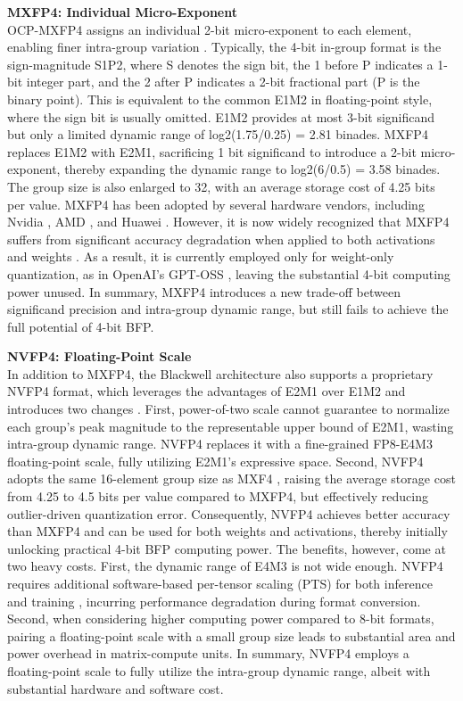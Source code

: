 \noindent\textbf{MXFP4: Individual Micro-Exponent} \\ 
OCP-MXFP4 assigns an individual 2-bit micro-exponent to each 
element, enabling finer intra-group variation \cite{Rouhani2023a}. 
Typically, the 4-bit in-group format is the sign-magnitude S1P2, 
where S denotes the sign bit, the 1 before P indicates a 1-bit integer part, 
and the 2 after P indicates a 2-bit fractional part (P is the binary point).
This is equivalent to the common E1M2 in floating-point style, where the 
sign bit is usually omitted. 
E1M2 provides at most 3-bit significand but only a limited dynamic range of 
log2(1.75/0.25) = 2.81 binades.  
MXFP4 replaces E1M2 with E2M1, sacrificing 1 bit significand to introduce 
a 2-bit micro-exponent, thereby expanding the dynamic range to 
log2(6/0.5) = 3.58 binades. 
The group size is also enlarged to 32, with an average storage cost of 4.25 
bits per value. 
MXFP4 has been adopted by several hardware vendors, including 
Nvidia \cite{Micikevicius2025}, AMD \cite{AMD2025}, and Huawei \cite{Eric2025}. 
However, it is now widely recognized that MXFP4 suffers from significant 
accuracy degradation when applied to both activations and weights 
\cite{Rouhani2023}. 
As a result, it is currently employed only for weight-only quantization, 
as in OpenAI's GPT-OSS \cite{Agarwal2025}, leaving the substantial 4-bit 
computing power unused. 
In summary, MXFP4 introduces a new trade-off between significand precision 
and intra-group dynamic range, 
but still fails to achieve the full potential of 4-bit BFP. 

\noindent\textbf{NVFP4: Floating-Point Scale} \\
In addition to MXFP4, the Blackwell architecture also supports a proprietary 
NVFP4 format, 
which leverages the advantages of E2M1 over E1M2 and introduces two changes 
\cite{Micikevicius2025}. 
First, power-of-two scale cannot guarantee to normalize each group's peak 
magnitude to the representable upper bound of E2M1, 
wasting intra-group dynamic range. 
NVFP4 replaces it with a fine-grained FP8-E4M3 floating-point scale, 
fully utilizing E2M1's expressive space. 
Second, NVFP4 adopts the same 16-element group size 
as MXF4 \cite{DarvishRouhani2023}, 
raising the average storage cost from 4.25 to 4.5 bits per value compared to 
MXFP4, but effectively reducing outlier-driven quantization error. 
Consequently, NVFP4 achieves better accuracy than MXFP4 and can be used for 
both weights and activations, 
thereby initially unlocking practical 4-bit BFP computing power. 
The benefits, however, come at two heavy costs. 
First, the dynamic range of E4M3 is not wide enough. 
NVFP4 requires additional software-based per-tensor scaling (PTS) for both 
inference \cite{Alvarez2025} and training \cite{Abecassis2025}, 
incurring performance degradation during format conversion. 
Second, when considering higher computing power compared to 8-bit formats, 
pairing a floating-point scale with a small group size leads to substantial 
area and power overhead in matrix-compute units. 
In summary, NVFP4 employs a floating-point scale to fully utilize the 
intra-group dynamic range, 
albeit with substantial hardware and software cost. 

